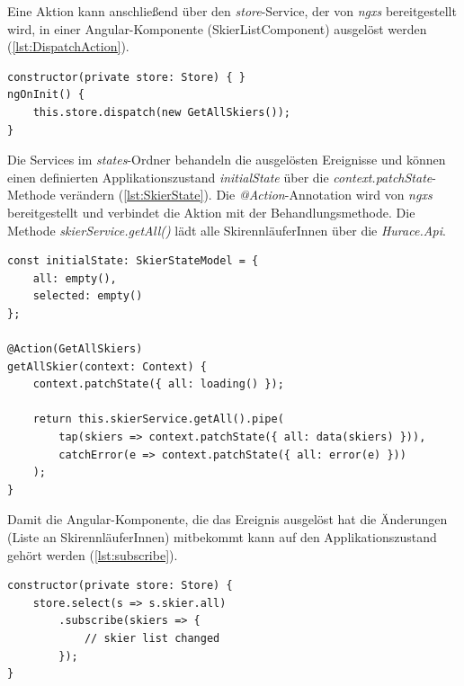 Eine Aktion kann anschließend über den \emph{store}-Service, der von \emph{ngxs} bereitgestellt wird, in einer Angular-Komponente (\zB SkierListComponent) ausgelöst werden (\cref{lst:DispatchAction}).

\begin{lstlisting}[caption={Auslösen einer Skier-Aktion}, label=lst:DispatchAction]
constructor(private store: Store) { }
ngOnInit() {
    this.store.dispatch(new GetAllSkiers());
}
\end{lstlisting}

Die Services im \emph{states}-Ordner behandeln die ausgelösten Ereignisse und können einen definierten Applikationszustand \emph{initialState} über die \emph{context.patchState}-Methode verändern (\cref{lst:SkierState}).
Die \emph{@Action}-Annotation wird von \emph{ngxs} bereitgestellt und verbindet die Aktion mit der Behandlungsmethode.
Die Methode \emph{skierService.getAll()} lädt alle SkirennläuferInnen über die \emph{Hurace.Api}.

\begin{lstlisting}[caption={Behandeln einer Skier-Aktion}, label=lst:SkierState]
const initialState: SkierStateModel = {
    all: empty(),
    selected: empty()
};

@Action(GetAllSkiers)
getAllSkier(context: Context) {
    context.patchState({ all: loading() });

    return this.skierService.getAll().pipe(
        tap(skiers => context.patchState({ all: data(skiers) })),
        catchError(e => context.patchState({ all: error(e) }))
    );
}
\end{lstlisting}

Damit die Angular-Komponente, die das Ereignis ausgelöst hat die Änderungen (Liste an SkirennläuferInnen) mitbekommt kann auf den Applikationszustand gehört werden (\cref{lst:subscribe}).

\begin{lstlisting}[caption={Hören auf Zustandsänderungen}, label=lst:subscribe]
constructor(private store: Store) {
    store.select(s => s.skier.all)
        .subscribe(skiers => {
            // skier list changed
        });
}
\end{lstlisting}

